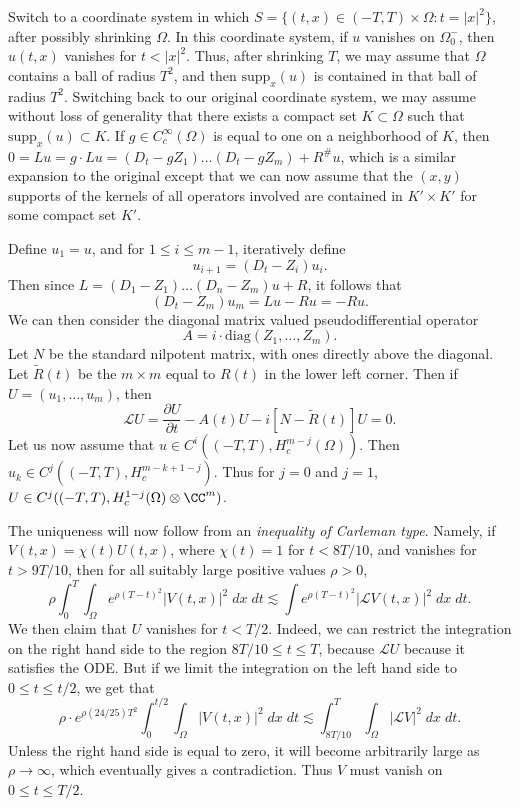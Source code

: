 \begin{remark}
    Switch to a coordinate system in which $S = \{ (t,x) \in (-T,T) \times \Omega : t = |x|^2 \}$, after possibly shrinking $\Omega$. In this coordinate system, if $u$ vanishes on $\Omega_0^-$, then $u(t,x)$ vanishes for $t < |x|^2$. Thus, after shrinking $T$, we may assume that $\Omega$ contains a ball of radius $T^2$, and then $\text{supp}_x(u)$ is contained in that ball of radius $T^2$. Switching back to our original coordinate system, we may assume without loss of generality that there exists a compact set $K \subset \Omega$ such that $\text{supp}_x(u) \subset K$. If $g \in C_c^\infty(\Omega)$ is equal to one on a neighborhood of $K$, then $0 = Lu = g \cdot Lu = (D_t - g Z_1) \dots (D_t - g Z_m) + R^\# u$, which is a similar expansion to the original except that we can now assume that the $(x,y)$ supports of the kernels of all operators involved are contained in $K' \times K'$ for some compact set $K'$.
\end{remark}

Define $u_1 = u$, and for $1 \leq i \leq m-1$, iteratively define
%
\[ u_{i+1} = (D_t - Z_i) u_i. \]
%
Then since $L = (D_1 - Z_1) \dots (D_n - Z_m) u + R$, it follows that
%
\[ (D_t - Z_m) u_m = Lu - Ru = -Ru. \]
%
We can then consider the diagonal matrix valued pseudodifferential operator
%
\[ A = i \cdot \text{diag}(Z_1,\dots,Z_m). \]
%
Let $N$ be the standard nilpotent matrix, with ones directly above the diagonal. Let $\tilde{R}(t)$ be the $m \times m$ equal to $R(t)$ in the lower left corner. Then if $U = (u_1,\dots,u_m)$, then
%
\[ \mathcal{L}U = \frac{\partial U}{\partial t} - A(t) U - i [N - \tilde{R}(t)] U = 0. \]
%
Let us now assume that $u \in C^i((-T,T), H^{m-j}_c(\Omega))$. Then $u_k \in C^j((-T,T), H^{m-k+1-j}_c)$. Thus for $j = 0$ and $j = 1$, $U \in C^j((-T,T), H^{1-j}_c(\Omega) \otimes \CC^m)$.

The uniqueness will now follow from an \emph{inequality of Carleman type}. Namely, if $V(t,x) = \chi(t) U(t,x)$, where $\chi(t) = 1$ for $t < 8T/10$, and vanishes for $t > 9T/10$, then for all suitably large positive values $\rho > 0$,
%
\[ \rho \int_0^T \int_\Omega e^{\rho(T-t)^2} |V(t,x)|^2\; dx\; dt \lesssim \int e^{\rho (T - t)^2} |\mathcal{L}V(t,x)|^2\; dx\; dt. \]
%
We then claim that $U$ vanishes for $t < T/2$. Indeed, we can restrict the integration on the right hand side to the region $8T/10 \leq t \leq T$, because $\mathcal{L} U$ because it satisfies the ODE. But if we limit the integration on the left hand side to $0 \leq t \leq t/2$, we get that
%
\[ \rho \cdot e^{\rho (24/25) T^2} \int_0^{t/2} \int_\Omega |V(t,x)|^2\; dx \;dt \lesssim \int_{8T/10}^T \int_\Omega | \mathcal{L} V |^2 \; dx\; dt. \]
%
Unless the right hand side is equal to zero, it will become arbitrarily large as $\rho \to \infty$, which eventually gives a contradiction. Thus $V$ must vanish on $0 \leq t \leq T/2$.

